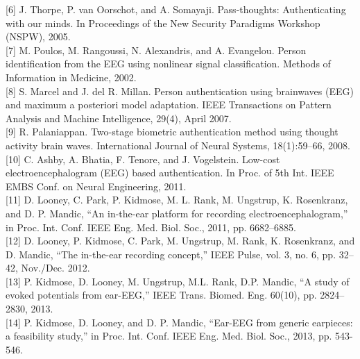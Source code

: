 \documentclass[11pt]{article}
\begin{document}
[6]
J. Thorpe, P. van Oorschot, and A. Somayaji. Pass-thoughts: Authenticating with our
minds. In Proceedings of the New Security Paradigms Workshop (NSPW), 2005.
\hspace{0pt} \\

[7]
M. Poulos, M. Rangoussi, N. Alexandris, and A. Evangelou. Person identification from the
EEG using nonlinear signal classification. Methods of Information in Medicine, 2002.
\hspace{0pt} \\

[8]
S. Marcel and J. del R. Millan. Person authentication using brainwaves (EEG) and
maximum a posteriori model adaptation. IEEE Transactions on Pattern Analysis and
Machine Intelligence, 29(4), April 2007.
\hspace{0pt} \\

[9]
R. Palaniappan. Two-stage biometric authentication method using thought activity brain
waves. International Journal of Neural Systems, 18(1):59–66, 2008.
\hspace{0pt} \\

[10]
C. Ashby, A. Bhatia, F. Tenore, and J. Vogelstein. Low-cost electroencephalogram (EEG)
based authentication. In Proc. of 5th Int. IEEE EMBS Conf. on Neural Engineering, 2011.
\hspace{0pt} \\

[11]
D. Looney, C. Park, P. Kidmose, M. L. Rank, M. Ungstrup, K. Rosenkranz, and D. P.
Mandic, “An in-the-ear platform for recording electroencephalogram,” in Proc. Int. Conf.
IEEE Eng. Med. Biol. Soc., 2011, pp. 6682–6885.
\hspace{0pt} \\

[12]
D. Looney, P. Kidmose, C. Park, M. Ungstrup, M. Rank, K. Rosenkranz, and D. Mandic,
“The in-the-ear recording concept,” IEEE Pulse, vol. 3, no. 6, pp. 32–42, Nov./Dec. 2012.
\hspace{0pt} \\

[13]
P. Kidmose, D. Looney, M. Ungstrup, M.L. Rank, D.P. Mandic, “A study of evoked
potentials from ear-EEG,” IEEE Trans. Biomed. Eng. 60(10), pp. 2824–2830, 2013.
\hspace{0pt} \\

[14]
P. Kidmose, D. Looney, and D. P. Mandic, “Ear-EEG from generic earpieces: a feasibility
study,” in Proc. Int. Conf. IEEE Eng. Med. Biol. Soc., 2013, pp. 543-546.
\hspace{0pt} \\
\end{document}
